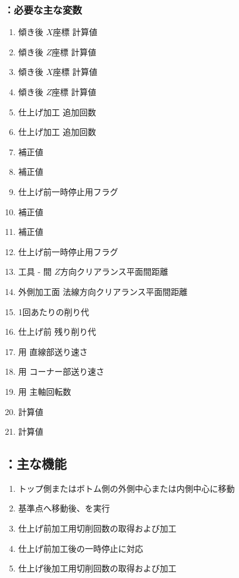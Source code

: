 \subsubsection{\KCurvedOutcutRLeft：必要な主な変数}
\begin{enumerate}[label*=\sarrow]
\item 傾き後 \TopSideCurvedOutcutCenter{} $X$座標{} 計算値
\item 傾き後 \TopSideCurvedOutcutCenter{} $Z$座標{} 計算値
\item 傾き後 \BottomSideCurvedOutcutCenter{} $X$座標{} 計算値
\item 傾き後 \BottomSideCurvedOutcutCenter{} $Z$座標{} 計算値
\item \TopOutcut{} 仕上げ加工 追加回数
\item \BottomOutcut{} 仕上げ加工 追加回数
\item \TopOutcutAsideThickness 補正値
\item \TopOutcutWidth 補正値
\item \TopOutcut{} 仕上げ前一時停止用フラグ
\item \BottomOutcutAsideThickness 補正値
\item \BottomOutcutWidth 補正値
\item \BottomOutcut{} 仕上げ前一時停止用フラグ
\item 工具 - \EndFace 間 $Z$方向クリアランス平面間距離
\item 外側加工面 法線方向クリアランス平面間距離
\item \OutcutMilling1回あたりの削り代
\item \OutcutMilling{} 仕上げ前 残り削り代
\item \OutcutMilling 用 直線部送り速さ
\item \OutcutMilling 用 コーナー部送り速さ
\item \OutcutMilling 用 主軸回転数
\item \TopCurvedOutcutAngle{} 計算値
\item \BottomCurvedOutcutAngle{} 計算値
\end{enumerate}


\subsection{\KCurvedOutcutRLeft：主な機能}
\begin{enumerate}[label*=\sarrow]
\item トップ側またはボトム側の外側中心または内側中心に移動
\item 基準点へ移動後、\KOLeftFSZ を実行
\item 仕上げ前加工用切削回数の取得および加工
\item 仕上げ前加工後の一時停止\OpauseCheck に対応
\item 仕上げ後加工用切削回数の取得および加工
\end{enumerate}


